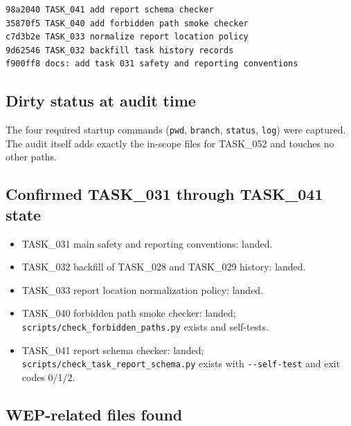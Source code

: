 \documentclass[11pt,a4paper]{article}
\begin{document}
\begin{verbatim}
98a2040 TASK_041 add report schema checker
35870f5 TASK_040 add forbidden path smoke checker
c7d3b2e TASK_033 normalize report location policy
9d62546 TASK_032 backfill task history records
f900ff8 docs: add task 031 safety and reporting conventions
\end{verbatim}

\subsection{Dirty status at audit time}

The four required startup commands (\texttt{pwd}, \texttt{branch},
\texttt{status}, \texttt{log}) were captured. The audit itself adds
exactly the in-scope files for TASK\_052 and touches no other paths.

\subsection{Confirmed TASK\_031 through TASK\_041 state}

\begin{itemize}[leftmargin=2em]
  \item TASK\_031 main safety and reporting conventions: landed.
  \item TASK\_032 backfill of TASK\_028 and TASK\_029 history: landed.
  \item TASK\_033 report location normalization policy: landed.
  \item TASK\_040 forbidden path smoke checker: landed;
        \texttt{scripts/check\_forbidden\_paths.py} exists and self-tests.
  \item TASK\_041 report schema checker: landed;
        \texttt{scripts/check\_task\_report\_schema.py} exists with
        \texttt{-{}-self-test} and exit codes 0/1/2.
\end{itemize}

\subsection{WEP-related files found}
\end{document}
